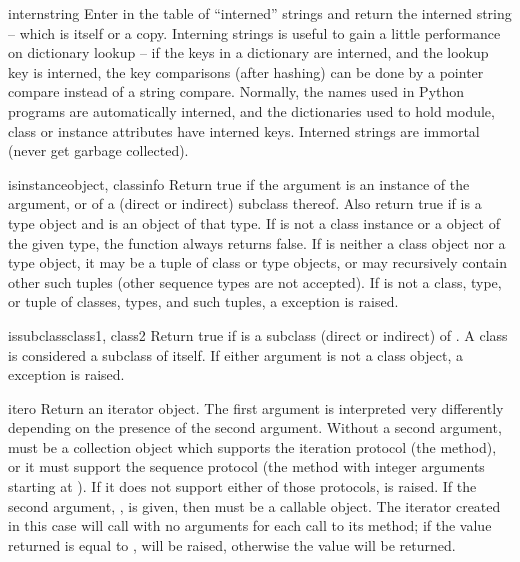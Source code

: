 \begin{funcdesc}{intern}{string}
  Enter  in the table of ``interned'' strings and return
  the interned string -- which is  itself or a copy.
  Interning strings is useful to gain a little performance on
  dictionary lookup -- if the keys in a dictionary are interned, and
  the lookup key is interned, the key comparisons (after hashing) can
  be done by a pointer compare instead of a string compare.  Normally,
  the names used in Python programs are automatically interned, and
  the dictionaries used to hold module, class or instance attributes
  have interned keys.  Interned strings are immortal (never get
  garbage collected).
\end{funcdesc}

\begin{funcdesc}{isinstance}{object, classinfo}
  Return true if the  argument is an instance of the
   argument, or of a (direct or indirect) subclass
  thereof.  Also return true if  is a type object and
   is an object of that type.  If  is not a
  class instance or a object of the given type, the function always
  returns false.  If  is neither a class object nor a
  type object, it may be a tuple of class or type objects, or may
  recursively contain other such tuples (other sequence types are not
  accepted).  If  is not a class, type, or tuple of
  classes, types, and such tuples, a  exception
  is raised.
\end{funcdesc}

\begin{funcdesc}{issubclass}{class1, class2}
  Return true if  is a subclass (direct or indirect) of
  .  A class is considered a subclass of itself.  If
  either argument is not a class object, a 
  exception is raised.
\end{funcdesc}

\begin{funcdesc}{iter}{o}
  Return an iterator object.  The first argument is interpreted very
  differently depending on the presence of the second argument.
  Without a second argument,  must be a collection object which
  supports the iteration protocol (the  method), or
  it must support the sequence protocol (the 
  method with integer arguments starting at ).  If it does not
  support either of those protocols,  is raised.
  If the second argument, , is given, then  must
  be a callable object.  The iterator created in this case will call
   with no arguments for each call to its 
  method; if the value returned is equal to ,
   will be raised, otherwise the value will
  be returned.
\end{funcdesc}

